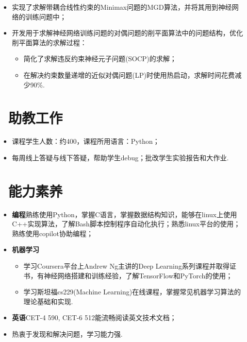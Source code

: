 \documentclass{resume}
\begin{document}
\begin{itemize}
	\item 实现了求解带耦合线性约束的Minimax问题的MGD算法，并将其用到神经网络的训练问题中；
	\item 开发用于求解神经网络训练问题的对偶问题的削平面算法中的问题结构，优化削平面算法的求解过程：
	      \begin{itemize}[label=$\ast$]
		      \item 简化了求解违反约束神经元子问题(SOCP)的求解；
		      \item 在解决约束数量递增的近似对偶问题(LP)时使用热启动，求解时间花费减少90\%.
	      \end{itemize}
\end{itemize}

\section{\faUniversity\ 助教工作}
\begin{itemize}
	\item 课程学生人数：约400，课程所用语言：Python；
	\item 每周线上答疑与线下答疑，帮助学生debug；批改学生实验报告和大作业.
\end{itemize}

\section{\faCogs\ 能力素养}
\begin{itemize}[parsep=0.5ex]
	\item \textbf{编程}\quad 熟练使用Python，掌握C语言，掌握数据结构知识，能够在linux上使用C++实现算法，了解Bash脚本控制程序自动化执行；熟悉linux平台的使用；熟练使用copilot协助编程；
	\item \textbf{机器学习}
	      \begin{itemize}[parsep=0.5ex,label=$\ast$]
		      \item 学习Coursera平台上Andrew Ng主讲的Deep Learning系列课程并取得证书，有神经网络搭建和训练经验，了解TensorFlow和PyTorch的使用；
		      \item 学习斯坦福cs229(Machine Learning)在线课程，掌握常见机器学习算法的理论基础和实现.
	      \end{itemize}

	\item \textbf{英语}\quad CET-4 590, CET-6 512\quad 能流畅阅读英文技术文档；
	\item 热衷于发现和解决问题，学习能力强.

\end{itemize}
\end{document}
